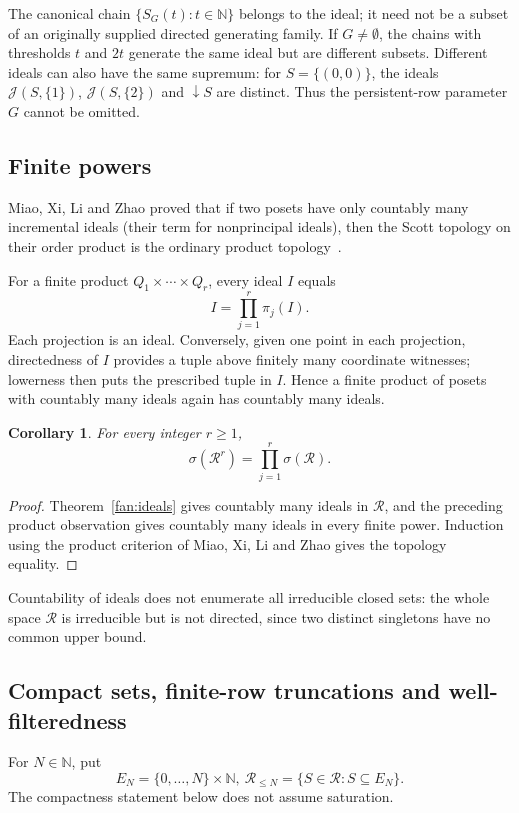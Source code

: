 \documentclass[fleqn,preprint,3p,a4paper]{elsarticle}
\newtheorem{corollary}[theorem]{Corollary}
\theoremstyle{definition}
\newcommand{\N}{\mathbb N}
\newcommand{\RR}{\mathcal R}
\begin{document}
The canonical chain $\{S_G(t):t\in\N\}$ belongs to the ideal; it need not be a subset of an originally supplied directed generating family. If $G\neq\emptyset$, the chains with thresholds $t$ and $2t$ generate the same ideal but are different subsets. Different ideals can also have the same supremum: for $S=\{(0,0)\}$, the ideals $\mathcal J(S,\{1\})$, $\mathcal J(S,\{2\})$ and ${\downarrow} S$ are distinct. Thus the persistent-row parameter $G$ cannot be omitted.

\subsection{Finite powers}
Miao, Xi, Li and Zhao proved that if two posets have only countably many incremental ideals (their term for nonprincipal ideals), then the Scott topology on their order product is the ordinary product topology~\cite[Lemma~4.1, pp.~827--829]{MXLZ}.

For a finite product $Q_1\times\cdots\times Q_r$, every ideal $I$ equals
\[
 I=\prod_{j=1}^r\pi_j(I).
\]
Each projection is an ideal. Conversely, given one point in each projection, directedness of $I$ provides a tuple above finitely many coordinate witnesses; lowerness then puts the prescribed tuple in $I$. Hence a finite product of posets with countably many ideals again has countably many ideals.

\begin{corollary}\label{fan:finitepowers}
For every integer $r\geq1$,
\[
 \sigma(\RR^r)=\prod_{j=1}^r\sigma(\RR).
\]
\end{corollary}
\begin{proof}
Theorem~\ref{fan:ideals} gives countably many ideals in $\RR$, and the preceding product observation gives countably many ideals in every finite power. Induction using the product criterion of Miao, Xi, Li and Zhao gives the topology equality.
\end{proof}

Countability of ideals does not enumerate all irreducible closed sets: the whole space $\RR$ is irreducible but is not directed, since two distinct singletons have no common upper bound.


\subsection{Compact sets, finite-row truncations and well-filteredness}
For $N\in\N$, put
\[
 E_N=\{0,\ldots,N\}\times\N,
 ~
 \RR_{\leq N}=\{S\in\RR:S\subseteq E_N\}.
\]
The compactness statement below does not assume saturation.
\end{document}
